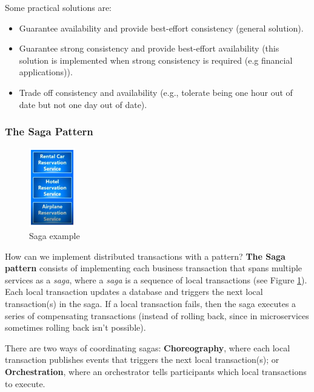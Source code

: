 \noindent Some practical solutions are:
\begin{itemize}
    \item Guarantee availability and provide best-effort consistency (general solution).
    \item Guarantee strong consistency and provide best-effort availability (this solution is implemented when strong consistency is required (e.g financial applications)).
    \item Trade off consistency and availability (e.g., tolerate being one hour out of date but not one day out of date).
\end{itemize}

\subsubsection{The Saga Pattern}

\begin{figure}
\includegraphics[width=0.18\textwidth]{images/Microservices/Saga.PNG}
    \caption{Saga example}
    \label{fig:Saga}
\end{figure}

How can we implement distributed transactions with a pattern? \textbf{The Saga pattern} consists of implementing each business transaction that spans multiple services as a \textit{saga}, where a \textit{saga} is a sequence of local transactions (see Figure \ref{fig:Saga}). Each local transaction updates a database and triggers the next local transaction(s) in the saga. If a local transaction fails, then the saga executes a series of compensating transactions (instead of rolling back, since in microservices sometimes rolling back isn't possible).

There are two ways of coordinating sagas: \newline\textbf{Choreography}, where each local transaction publishes events that triggers the next local transaction(s); or \textbf{Orchestration}, where an \newline orchestrator tells participants which local transactions to execute.


